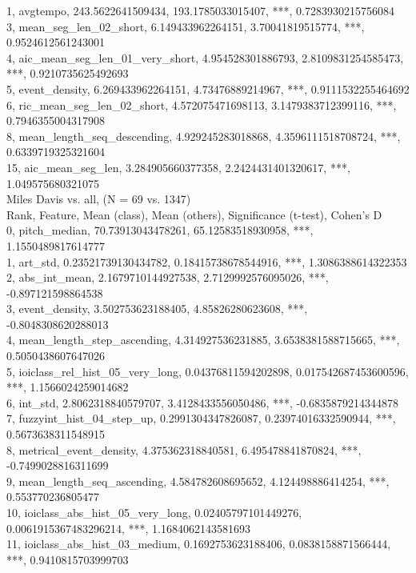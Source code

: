 1, avgtempo, 243.5622641509434, 193.1785033015407, ***, 0.7283930215756084\\
3, mean_seg_len_02_short, 6.149433962264151, 3.70041819515774, ***, 0.9524612561243001\\
4, aic_mean_seg_len_01_very_short, 4.954528301886793, 2.8109831254585473, ***, 0.9210735625492693\\
5, event_density, 6.269433962264151, 4.73476889214967, ***, 0.9111532255464692\\
6, ric_mean_seg_len_02_short, 4.572075471698113, 3.1479383712399116, ***, 0.7946355004317908\\
8, mean_length_seq_descending, 4.929245283018868, 4.3596111518708724, ***, 0.6339719325321604\\
15, aic_mean_seg_len, 3.284905660377358, 2.2424431401320617, ***, 1.049575680321075\\
Miles Davis vs. all, (N = 69 vs. 1347)\\
Rank, Feature, Mean (class), Mean (others), Significance (t-test), Cohen's D\\
0, pitch_median, 70.73913043478261, 65.12583518930958, ***, 1.1550489817614777\\
1, art_std, 0.23521739130434782, 0.18415738678544916, ***, 1.3086388614322353\\
2, abs_int_mean, 2.1679710144927538, 2.7129992576095026, ***, -0.897121598864538\\
3, event_density, 3.502753623188405, 4.85826280623608, ***, -0.8048308620288013\\
4, mean_length_step_ascending, 4.314927536231885, 3.6538381588715665, ***, 0.5050438607647026\\
5, ioiclass_rel_hist_05_very_long, 0.04376811594202898, 0.017542687453600596, ***, 1.1566024259014682\\
6, int_std, 2.8062318840579707, 3.4128433556050486, ***, -0.6835879214344878\\
7, fuzzyint_hist_04_step_up, 0.2991304347826087, 0.23974016332590944, ***, 0.5673638311548915\\
8, metrical_event_density, 4.375362318840581, 6.495478841870824, ***, -0.7499028816311699\\
9, mean_length_seq_ascending, 4.584782608695652, 4.124498886414254, ***, 0.553770236805477\\
10, ioiclass_abs_hist_05_very_long, 0.02405797101449276, 0.0061915367483296214, ***, 1.1684062143581693\\
11, ioiclass_abs_hist_03_medium, 0.1692753623188406, 0.0838158871566444, ***, 0.9410815703999703\\
